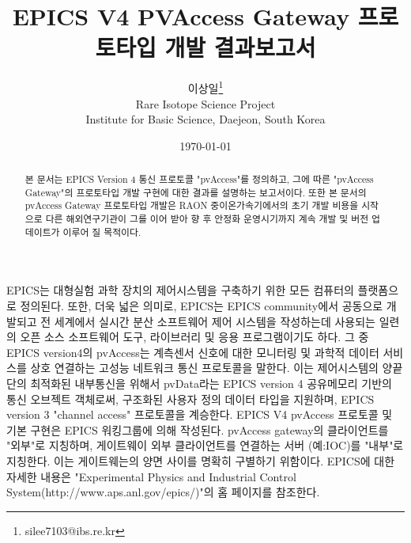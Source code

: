 \documentclass[11pt
  , a4paper
  , article
  , oneside
]{memoir}
\begin{document}
\newcommand{\technumber}{
  RAON Control-Document Series\\
  Revision : v1.0,   Release : 2016-12-02 fixed date}
\title{\textbf{EPICS V4 PVAccess Gateway 프로토타입 개발 결과보고서}}

\author{이상일\thanks{silee7103@ibs.re.kr} \\

  Rare Isotope Science Project\\
  Institute for Basic Science, Daejeon, South Korea
}
\date{\today}

\renewcommand{\maketitlehooka}{\begin{flushright}\textsf{\technumber}\end{flushright}}

\maketitle

\begin{abstract}
본 문서는 EPICS Version 4 통신 프로토콜 "pvAccess"를 정의하고, 그에 따른 "pvAccess Gateway"의 프로토타입 개발 구현에 대한 결과를 설명하는 보고서이다. 또한 본 문서의 pvAccess Gateway 프로토타입 개발은 RAON 중이온가속기에서의 초기 개발 비용을 시작으로 다른 해외연구기관이 그를 이어 받아 향 후 안정화 운영시기까지 계속 개발 및 버전 업데이트가 이루어 질 목적이다. 
\end{abstract}

EPICS는 대형실험 과학 장치의 제어시스템을 구축하기 위한 모든 컴퓨터의 플랫폼으로 정의된다. 또한, 더욱 넓은 의미로, EPICS는 EPICS community에서 공동으로 개발되고 전 세계에서 실시간 분산 소프트웨어 제어 시스템을 작성하는데 사용되는 일련의 오픈 소스 소프트웨어 도구, 라이브러리 및 응용 프로그램이기도 하다. 그 중 EPICS version4의 pvAccess는 계측센서 신호에 대한 모니터링 및 과학적 데이터 서비스를 상호 연결하는 고성능 네트워크 통신 프로토콜을 말한다. 이는 제어시스템의 양끝단의 최적화된 내부통신을 위해서 pvData라는 EPICS version 4 공유메모리 기반의 통신 오브젝트 객체로써, 구조화된 사용자 정의 데이터 타입을 지원하며, EPICS version 3 "channel access" 프로토콜을 계승한다. EPICS V4 pvAccess 프로토콜 및 기본 구현은 EPICS 워킹그룹에 의해 작성된다. pvAccess gateway의 클라이언트를 "외부"로 지칭하며, 게이트웨이 외부 클라이언트를  연결하는 서버 (예:IOC)를 "내부"로 지칭한다. 이는 게이트웨는의 양면 사이를 명확히 구별하기 위함이다. EPICS에 대한 자세한 내용은 "Experimental Physics and Industrial Control System(http://www.aps.anl.gov/epics/)"의 홈 페이지를 참조한다. 
\end{document}
